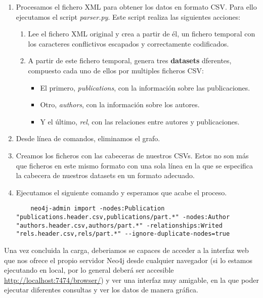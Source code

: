 \begin{enumerate}
 \item Procesamos el fichero \gls{XML} para obtener los datos en formato \gls{CSV}. Para ello ejecutamos el script \textit{parser.py}. Este script realiza las siguientes acciones:
 \begin{enumerate}
  \item Lee el fichero \gls{XML} original y crea a partir de él, un fichero temporal con los caracteres conflictivos escapados y correctamente codificados.
  \item A partir de este fichero temporal, genera tres \textbf{datasets} dferentes, compuesto cada uno de ellos por multiples ficheros \gls{CSV}:
  \begin{itemize}
   \item El primero, \textit{publications}, con la información sobre las publicaciones.
   \item Otro, \textit{authors}, con la información sobre los autores.
   \item Y el último, \textit{rel}, con las relaciones entre autores y publicaciones.
  \end{itemize}
 \end{enumerate}
 \item Desde línea de comandos, eliminamos el grafo.
 \item Creamos los ficheros con las cabeceras de nuestros \glspl{CSV}. Estos no son más que ficheros en este mismo formato con una sola línea en la que se especifica la cabecera de nuestros datasets en un formato adecuado.
 \item Ejecutamos el siguiente comando y esperamos que acabe el proceso.
   \begin{verbatim}
    neo4j-admin import -nodes:Publication "publications.header.csv,publications/part.*" -nodes:Author "authors.header.csv,authors/part.*" -relationships:Writed "rels.header.csv,rels/part.*" --ignore-duplicate-nodes=true
   \end{verbatim}
\end{enumerate}

Una vez concluida la carga, deberiamos se capaces de acceder a la interfaz web que nos ofrece el propio servidor Neo4j desde cualquier navegador (si lo estamos ejecutando en local, por lo general deberá ser accesible \url{http://localhost:7474/browser/}) y ver una interfaz muy amigable, en la que poder ejecutar diferentes consultas y ver los datos de manera gráfica.

